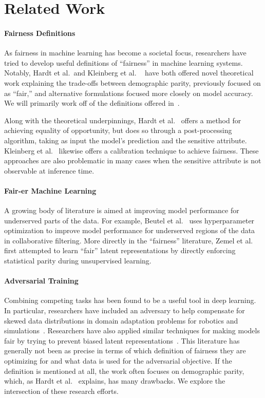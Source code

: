 \documentclass[sigconf,9pt]{acmart}
\begin{document}
\section{Related Work}
\paragraph{Fairness Definitions}
As fairness in machine learning has become a societal focus, researchers have tried to develop useful definitions of ``fairness'' in machine learning systems.  Notably, Hardt et al.\ and Kleinberg et al. ~\cite{hardt2016equality,kleinberg2016inherent} have both offered novel theoretical work explaining the trade-offs between demographic parity, previously focused on as ``fair,'' and alternative formulations focused more closely on model accuracy.  We will primarily work off of the definitions offered in~\cite{hardt2016equality}.

Along with the theoretical underpinnings, Hardt et al.~\cite{hardt2016equality} offers a method for achieving equality of opportunity, but does so through a post-processing algorithm, taking as input the model's prediction and the sensitive attribute.  Kleinberg et al.~\cite{kleinberg2016inherent} likewise offers a calibration technique to achieve fairness.  These approaches are also problematic in many cases when the sensitive attribute is not observable at inference time.

\paragraph{Fair-er Machine Learning}
A growing body of literature is aimed at improving model performance for underserved parts of the data.  For example, Beutel et al.~\cite{beutel2017beyond} uses hyperparameter optimization to improve model performance for underserved regions of the data in collaborative filtering.  More directly in the ``fairness'' literature, Zemel et al.~\cite{zemel2013learning} first attempted to learn ``fair'' latent representations by directly enforcing statistical parity during unsupervised learning.

\paragraph{Adversarial Training}
Combining competing tasks has been found to be a useful tool in deep learning.  In particular, researchers have included an adversary to help compensate for skewed data distributions in domain adaptation problems for robotics and simulations~\cite{bousmalis2016domain,ganin2016domain}.  Researchers have also applied similar techniques for making models fair by trying to prevent biased latent representations~\cite{edwards2015censoring,louizos2015variational}.  This literature has generally not been as precise in terms of which definition of fairness they are optimizing for and what data is used for the adversarial objective.  If the definition is mentioned at all, the work often focuses on demographic parity, which, as Hardt et al.~\cite{hardt2016equality} explains, has many drawbacks.  We explore the intersection of these research efforts.
\end{document}
